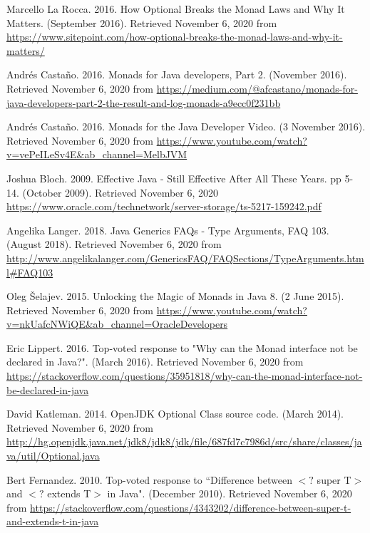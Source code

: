 %
% 
% 
%
\begin{thebibliography}{}
%
%
Marcello La Rocca. 2016. How Optional Breaks the Monad Laws and Why It Matters. (September 2016). Retrieved November 6, 2020 from \url{https://www.sitepoint.com/how-optional-breaks-the-monad-laws-and-why-it-matters/}

Andrés Castaño. 2016. Monads for Java developers, Part 2. (November 2016). Retrieved November 6, 2020 from \url{https://medium.com/@afcastano/monads-for-java-developers-part-2-the-result-and-log-monads-a9ecc0f231bb}

Andrés Castaño. 2016. Monads for the Java Developer Video. (3 November 2016). Retrieved November 6, 2020 from \url{https://www.youtube.com/watch?v=vePeILeSv4E&ab_channel=MelbJVM}

Joshua Bloch. 2009. Effective Java - Still Effective After All These Years. pp 5-14. (October 2009). Retrieved November 6, 2020 \url{https://www.oracle.com/technetwork/server-storage/ts-5217-159242.pdf}

Angelika Langer. 2018. Java Generics FAQs - Type Arguments, FAQ 103. (August 2018). Retrieved November 6, 2020 from \url{http://www.angelikalanger.com/GenericsFAQ/FAQSections/TypeArguments.html#FAQ103}

Oleg Šelajev. 2015. Unlocking the Magic of Monads in Java 8. (2 June 2015). Retrieved November 6, 2020 from \url{https://www.youtube.com/watch?v=nkUafcNWiQE&ab_channel=OracleDevelopers}

Eric Lippert. 2016. Top-voted response to "Why can the Monad interface not be declared in Java?". (March 2016). Retrieved November 6, 2020 from \url{https://stackoverflow.com/questions/35951818/why-can-the-monad-interface-not-be-declared-in-java}

David Katleman. 2014. OpenJDK Optional Class source code. (March 2014). Retrieved November 6, 2020 from \url{http://hg.openjdk.java.net/jdk8/jdk8/jdk/file/687fd7c7986d/src/share/classes/java/util/Optional.java}

Bert Fernandez. 2010. Top-voted response to ``Difference between $<?$ super T$>$ and $<?$ extends T$>$ in Java". (December 2010). Retrieved November 6, 2020 from \url{https://stackoverflow.com/questions/4343202/difference-between-super-t-and-extends-t-in-java}


\end{thebibliography}
